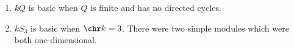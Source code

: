 \begin{enumerate}
	\item $kQ$ is basic when $Q$ is finite and has no directed cycles.
	\item $kS_3$ is basic when $\chr k=3$. There were two simple modules which
		were both one-dimensional.
\end{enumerate}
